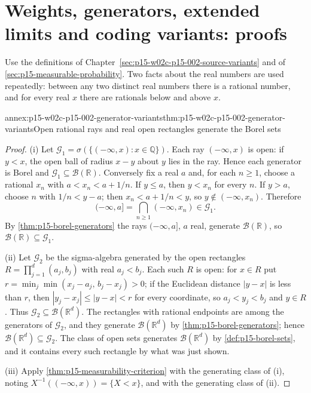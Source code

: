 \section{Weights, generators, extended limits and coding variants: proofs}
\label{sec:annex-p15-w02c-p15-002-source-variants}

Use the definitions of
Chapter~\ref{sec:p15-w02c-p15-002-source-variants} and of
\cref{sec:p15-measurable-probability}. Two facts about the real numbers
are used repeatedly: between any two distinct real numbers there is a
rational number, and for every real \(x\) there are rationals below and
above \(x\).

\begin{annexitem}{annex:p15-w02c-p15-002-generator-variants}{thm:p15-w02c-p15-002-generator-variants}{Open rational rays and real open rectangles generate the Borel sets}
\begin{proof}
(i) Let \(\mathcal G_1=\sigma(\{(-\infty,x):x\in\mathbb Q\})\). Each ray
\((-\infty,x)\) is open: if \(y<x\), the open ball of radius \(x-y\) about
\(y\) lies in the ray. Hence each generator is Borel and
\(\mathcal G_1\subseteq\mathcal B(\mathbb R)\). Conversely fix a real
\(a\) and, for each \(n\geq1\), choose a rational \(x_n\) with
\(a<x_n<a+1/n\). If \(y\leq a\), then \(y<x_n\) for every \(n\). If
\(y>a\), choose \(n\) with \(1/n<y-a\); then \(x_n<a+1/n<y\), so
\(y\notin(-\infty,x_n)\). Therefore
\[
 (-\infty,a]=\bigcap_{n\geq1}(-\infty,x_n)\in\mathcal G_1 .
\]
By \cref{thm:p15-borel-generators} the rays \((-\infty,a]\), \(a\) real,
generate \(\mathcal B(\mathbb R)\), so
\(\mathcal B(\mathbb R)\subseteq\mathcal G_1\).

(ii) Let \(\mathcal G_2\) be the sigma-algebra generated by the open
rectangles \(R=\prod_{j=1}^d(a_j,b_j)\) with real \(a_j<b_j\). Each such
\(R\) is open: for \(x\in R\) put
\(r=\min_j\min(x_j-a_j,\,b_j-x_j)>0\); if the Euclidean distance
\(|y-x|\) is less than \(r\), then \(|y_j-x_j|\leq|y-x|<r\) for every
coordinate, so \(a_j<y_j<b_j\) and \(y\in R\). Thus
\(\mathcal G_2\subseteq\mathcal B(\mathbb R^d)\). The rectangles with
rational endpoints are among the generators of \(\mathcal G_2\), and they
generate \(\mathcal B(\mathbb R^d)\) by \cref{thm:p15-borel-generators};
hence \(\mathcal B(\mathbb R^d)\subseteq\mathcal G_2\). The class of open
sets generates \(\mathcal B(\mathbb R^d)\) by
\cref{def:p15-borel-sets}, and it contains every such rectangle by what
was just shown.

(iii) Apply \cref{thm:p15-measurability-criterion} with the generating
class of (i), noting \(X^{-1}((-\infty,x))=\{X<x\}\), and with the
generating class of (ii).
\end{proof}
\end{annexitem}

